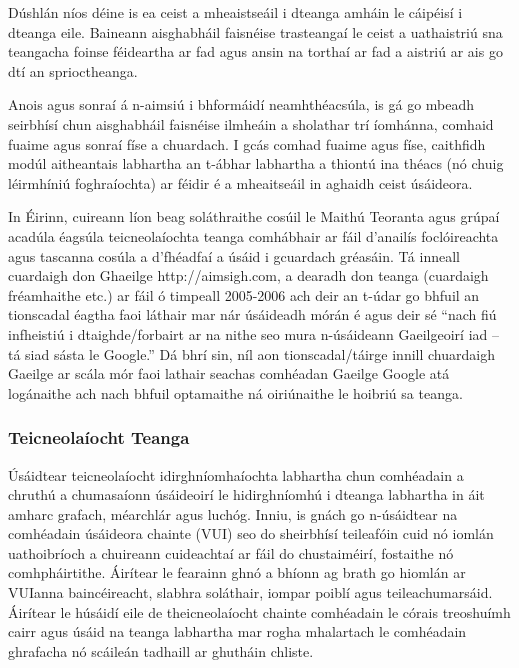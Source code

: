 \documentclass[]{../../metanetpaper}
\begin{document}
\begin{multicols}{2}

Dúshlán níos déine is ea ceist a mheaistseáil i dteanga amháin le cáipéisí i dteanga eile. Baineann aisghabháil faisnéise trasteangaí  le ceist a uathaistriú sna teangacha foinse féideartha ar fad agus ansin na torthaí ar fad a aistriú ar ais go dtí an sprioctheanga. 

Anois agus sonraí á n-aimsiú i bhformáidí neamhthéacsúla, is gá go mbeadh seirbhísí chun aisghabháil faisnéise ilmheáin a sholathar trí íomhánna, comhaid fuaime agus sonraí físe a chuardach. I gcás comhad fuaime agus físe, caithfidh modúl aitheantais labhartha an t-ábhar labhartha a thiontú ina théacs (nó chuig léirmhíniú foghraíochta) ar féidir é a mheaitseáil in aghaidh ceist úsáideora.

 In Éirinn, cuireann líon beag soláthraithe cosúil le Maithú Teoranta agus grúpaí acadúla éagsúla teicneolaíochta teanga comhábhair ar fáil d’anailís foclóireachta agus tascanna cosúla a d’fhéadfaí a úsáid i gcuardach gréasáin. Tá inneall cuardaigh don Ghaeilge http://aimsigh.com, a dearadh don teanga (cuardaigh fréamhaithe etc.) ar fáil ó timpeall 2005-2006 ach deir an t-údar go bhfuil an tionscadal éagtha faoi láthair mar nár úsáideadh mórán é agus deir sé ``nach fiú infheistiú i dtaighde/forbairt ar na nithe seo mura n-úsáideann Gaeilgeoirí iad – tá siad sásta le Google.''  Dá bhrí sin, níl aon tionscadal/táirge innill chuardaigh Gaeilge ar scála mór faoi lathair seachas comhéadan Gaeilge Google atá logánaithe ach nach bhfuil optamaithe ná oiriúnaithe le hoibriú sa teanga.
  
\subsubsection{Teicneolaíocht Teanga}

Úsáidtear teicneolaíocht idirghníomhaíochta labhartha chun comhéadain a chruthú a chumasaíonn úsáideoirí le hidirghníomhú i dteanga labhartha in áit amharc grafach, méarchlár agus luchóg. Inniu, is gnách go n-úsáidtear na comhéadain úsáideora chainte (VUI) seo do sheirbhísí teileafóin cuid nó iomlán uathoibríoch a chuireann cuideachtaí ar fáil do chustaiméirí, fostaithe nó comhpháirtithe. Áirítear le fearainn ghnó a bhíonn ag brath go hiomlán ar VUIanna baincéireacht, slabhra soláthair, iompar poiblí agus teileachumarsáid. Áirítear le húsáidí eile de theicneolaíocht chainte comhéadain le córais treoshuímh cairr agus úsáid na teanga labhartha mar rogha mhalartach le comhéadain ghrafacha nó scáileán tadhaill ar ghutháin chliste.


\end{multicols}
\end{document}
